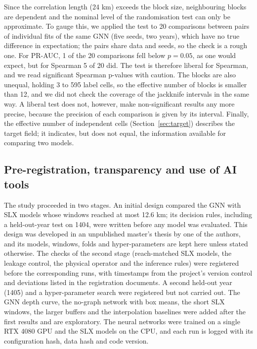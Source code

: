 \documentclass[pdflatex,sn-basic]{sn-jnl}
\begin{document}
Since the correlation length (24 km) exceeds the block size, neighbouring blocks are dependent and the nominal level of the randomisation test can only be approximate. To gauge this, we applied the test to 20 comparisons between pairs of individual fits of the same GNN (five seeds, two years), which have no true difference in expectation; the pairs share data and seeds, so the check is a rough one. For PR-AUC, 1 of the 20 comparisons fell below $p = 0.05$, as one would expect, but for Spearman 5 of 20 did. The test is therefore liberal for Spearman, and we read significant Spearman p-values with caution. The blocks are also unequal, holding 3 to 595 label cells, so the effective number of blocks is smaller than 12, and we did not check the coverage of the jackknife intervals in the same way. A liberal test does not, however, make non-significant results any more precise, because the precision of each comparison is given by its interval. Finally, the effective number of independent cells (Section~\ref{sec:target}) describes the target field; it indicates, but does not equal, the information available for comparing two models.

\subsection{Pre-registration, transparency and use of AI tools}\label{sec:prereg}

The study proceeded in two stages. An initial design compared the GNN with SLX models whose windows reached at most 12.6 km; its decision rules, including a held-out-year test on 1404, were written before any model was evaluated. This design was developed in an unpublished master's thesis by one of the authors, and its models, windows, folds and hyper-parameters are kept here unless stated otherwise. The checks of the second stage (reach-matched SLX models, the leakage control, the physical operator and the inference rules) were registered before the corresponding runs, with timestamps from the project's version control and deviations listed in the registration documents. A second held-out year (1405) and a hyper-parameter search were registered but not carried out. The GNN depth curve, the no-graph network with box means, the short SLX windows, the larger buffers and the interpolation baselines were added after the first results and are exploratory. The neural networks were trained on a single RTX 4080 GPU and the SLX models on the CPU, and each run is logged with its configuration hash, data hash and code version.
\end{document}
